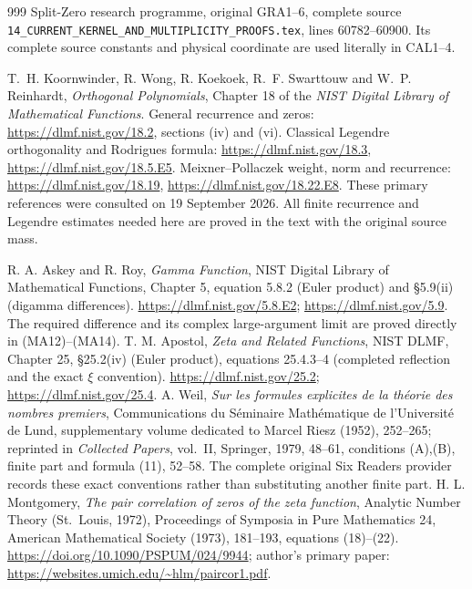 \begin{thebibliography}{999}
Split-Zero research programme, original GRA1--6, complete source
\texttt{14\_CURRENT\_KERNEL\_AND\_MULTIPLICITY\_PROOFS.tex},
lines 60782--60900. Its complete source constants and physical
coordinate are used literally in CAL1--4.

T.~H. Koornwinder, R. Wong, R. Koekoek, R.~F. Swarttouw and
W.~P. Reinhardt, \emph{Orthogonal Polynomials}, Chapter 18 of the
\emph{NIST Digital Library of Mathematical Functions}.
General recurrence and zeros: \url{https://dlmf.nist.gov/18.2},
sections (iv) and (vi).
Classical Legendre orthogonality and Rodrigues formula:
\url{https://dlmf.nist.gov/18.3},
\url{https://dlmf.nist.gov/18.5.E5}.
Meixner--Pollaczek weight, norm and recurrence:
\url{https://dlmf.nist.gov/18.19},
\url{https://dlmf.nist.gov/18.22.E8}.
These primary references were consulted on 19 September 2026.
All finite recurrence and Legendre estimates needed here are
proved in the text with the original source mass.


 R. A. Askey and R. Roy, \emph{Gamma Function}, NIST Digital
Library of Mathematical Functions, Chapter 5, equation 5.8.2 (Euler product)
and \S5.9(ii) (digamma differences).
\url{https://dlmf.nist.gov/5.8.E2}; \url{https://dlmf.nist.gov/5.9}.
The required difference and its complex large-argument limit are proved
directly in (MA12)--(MA14).
 T. M. Apostol, \emph{Zeta and Related Functions}, NIST DLMF,
Chapter 25, \S25.2(iv) (Euler product), equations 25.4.3--4 (completed
reflection and the exact $\xi$ convention).
\url{https://dlmf.nist.gov/25.2}; \url{https://dlmf.nist.gov/25.4}.
 A. Weil, \emph{Sur les formules explicites de la th\'eorie
des nombres premiers}, Communications du S\'eminaire Math\'ematique de
l'Universit\'e de Lund, supplementary volume dedicated to Marcel Riesz
(1952), 252--265; reprinted in \emph{Collected Papers}, vol.~II,
Springer, 1979, 48--61, conditions (A),(B), finite part and formula (11),
52--58. The complete original Six Readers provider records these exact
conventions rather than substituting another finite part.
 H. L. Montgomery, \emph{The pair correlation of zeros
of the zeta function}, Analytic Number Theory (St.~Louis, 1972),
Proceedings of Symposia in Pure Mathematics 24, American Mathematical
Society (1973), 181--193, equations (18)--(22).
\url{https://doi.org/10.1090/PSPUM/024/9944}; author's primary paper:
\url{https://websites.umich.edu/~hlm/paircor1.pdf}.


\end{thebibliography}
